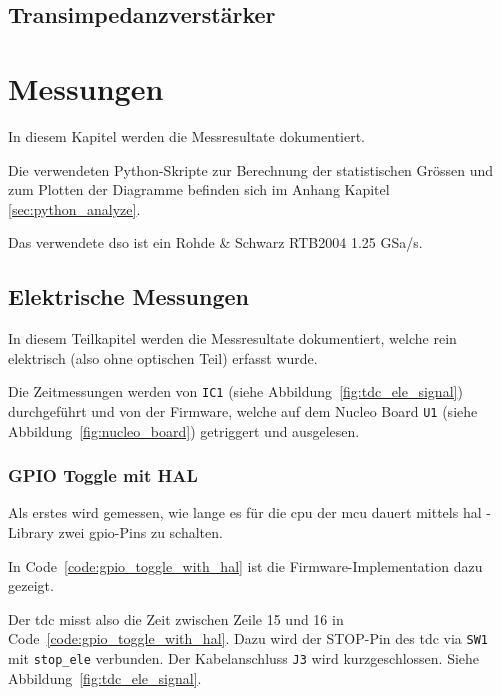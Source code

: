 \documentclass[11pt,a4paper,hidelinks]{article}
\begin{document}
\subsection{Transimpedanzverstärker}

\pagebreak

\section{Messungen}

In diesem Kapitel werden die Messresultate dokumentiert.

Die verwendeten Python-Skripte zur Berechnung der statistischen Grössen und zum Plotten der Diagramme befinden sich im
Anhang Kapitel \ref{sec:python_analyze}.

Das verwendete \acrfull{dso} ist ein Rohde \& Schwarz RTB2004 1.25 GSa/s.

\subsection{Elektrische Messungen}

In diesem Teilkapitel werden die Messresultate dokumentiert, welche rein elektrisch (also ohne optischen Teil) erfasst
wurde.

Die Zeitmessungen werden von \lstinline|IC1| (siehe Abbildung~\ref{fig:tdc_ele_signal}) durchgeführt und von der
Firmware, welche auf dem Nucleo Board \lstinline|U1| (siehe Abbildung~\ref{fig:nucleo_board}) getriggert und ausgelesen.

\subsubsection{GPIO Toggle mit HAL}\label{sec:gpio_toggle_with_hal}

Als erstes wird gemessen, wie lange es für die \acrshort{cpu} der \acrshort{mcu} dauert mittels \acrfull{hal} - Library
\cite{st2020stm32f0_hal} zwei \acrshort{gpio}-Pins zu schalten.

In Code~\ref{code:gpio_toggle_with_hal} ist die Firmware-Implementation dazu gezeigt.



Der \acrshort{tdc} misst also die Zeit zwischen Zeile 15 und 16 in Code~\ref{code:gpio_toggle_with_hal}. Dazu wird der
STOP-Pin des \acrshort{tdc} via \lstinline|SW1| mit \lstinline|stop_ele| verbunden. Der Kabelanschluss \lstinline|J3|
wird kurzgeschlossen. Siehe Abbildung~\ref{fig:tdc_ele_signal}.
\end{document}
